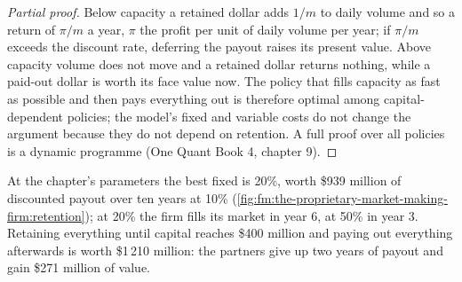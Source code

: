 \begin{proof}[Partial proof]
Below capacity a retained dollar adds $1/m$ to daily volume and so a return of $\pi/m$ a year, $\pi$ the profit per unit of daily volume per
year; if $\pi/m$ exceeds the discount rate, deferring the payout raises its present value. Above capacity volume does not move and a retained
dollar returns nothing, while a paid-out dollar is worth its face value now. The policy that fills capacity as fast as possible and then pays
everything out is therefore optimal among capital-dependent policies; the model's fixed and variable costs do not change the argument because
they do not depend on retention. A full proof over all policies is a dynamic programme (One Quant Book 4, chapter 9).
\end{proof}

At the chapter's parameters the best fixed  is 20\%, worth \$939 million of discounted payout over ten years at 10\%
(\cref{fig:fm:the-proprietary-market-making-firm:retention}); at 20\% the firm fills its market in year 6, at 50\% in year 3. Retaining everything
until capital reaches \$400 million and paying out everything afterwards is worth \$1\,210 million: the partners give up two years of payout and
gain \$271 million of value.

\begin{omfigure}

\label{fig:fm:the-proprietary-market-making-firm:retention}
\end{omfigure}

